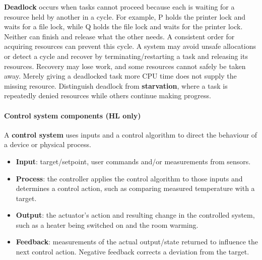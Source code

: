 \documentclass[a4paper,12pt]{article}
\begin{document}
\textbf{Deadlock} occurs when tasks cannot proceed because each is waiting for a resource held by another in a cycle. For example, P holds the printer lock and waits for a file lock, while Q holds the file lock and waits for the printer lock. Neither can finish and release what the other needs. A consistent order for acquiring resources can prevent this cycle. A system may avoid unsafe allocations or detect a cycle and recover by terminating/restarting a task and releasing its resources. Recovery may lose work, and some resources cannot safely be taken away. Merely giving a deadlocked task more CPU time does not supply the missing resource. Distinguish deadlock from \textbf{starvation}, where a task is repeatedly denied resources while others continue making progress.

\paragraph{Control system components (HL only)}
A \textbf{control system} uses inputs and a control algorithm to direct the behaviour of a device or physical process.
\begin{itemize}
    \item \textbf{Input}: target/setpoint, user commands and/or measurements from sensors.
    \item \textbf{Process}: the controller applies the control algorithm to those inputs and determines a control action, such as comparing measured temperature with a target.
    \item \textbf{Output}: the actuator's action and resulting change in the controlled system, such as a heater being switched on and the room warming.
    \item \textbf{Feedback}: measurements of the actual output/state returned to influence the next control action. Negative feedback corrects a deviation from the target.
\end{itemize}
\end{document}
